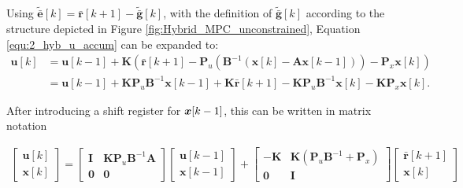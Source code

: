 Using $\tilde{\bar{\bm e}}[k]=\bar{\bm r}[k+1]-\bm \tilde{\bar{\bm{g}}}[k]$, with the definition of $\tilde{\bar{\bm{g}}}[k]$ according to the structure depicted in Figure \ref{fig:Hybrid_MPC_unconstrained}, Equation \eqref{equ:2_hyb_u_accum} can be expanded to:
\begin{align*}
	\bm u[k]
	&=
	\bm u[k-1]
	+\bm K
	\left(
	\bar{\bm r}[k+1]
	-\bm P_u
	\left(
	\bm B^{-1}
	\left(
	\bm x[k]-\bm A\bm x[k-1]
	\right)
	\right)
	-\bm P_x\bm x[k]
	\right)
	\\
	&=
	\bm u[k-1]
	+\bm K\bm P_u\bm B^{-1}\bm x[k-1]
	+\bm K\bar{\bm r}[k+1]
	-\bm K\bm P_u\bm B^{-1}\bm x[k]
	-\bm K\bm P_x\bm x[k].
\end{align*}

After introducing a shift register for ${\bm{x}}[k-1]$, this can be written in matrix notation

\begin{align}
		\begin{bmatrix}
		\bm u[k]\\
		\bm x[k]
	\end{bmatrix}
	=
	\begin{bmatrix}
		\bm I & \bm K\bm P_u\bm B^{-1}\bm A\\
		\bm 0 & \bm 0
	\end{bmatrix}
	\begin{bmatrix}
		\bm u[k-1]\\
		\bm x[k-1]
	\end{bmatrix}
	+
	\begin{bmatrix}
		-\bm K &
		\bm K\left(\bm P_u\bm B^{-1}+\bm P_x\right)
		\\
		\bm 0 & \bm I
	\end{bmatrix}
	\begin{bmatrix}
		\bar{\bm r}[k+1]\\
		\bm x[k]
	\end{bmatrix}
	\label{equ:2_hyb_mpc_ss}
\end{align}


